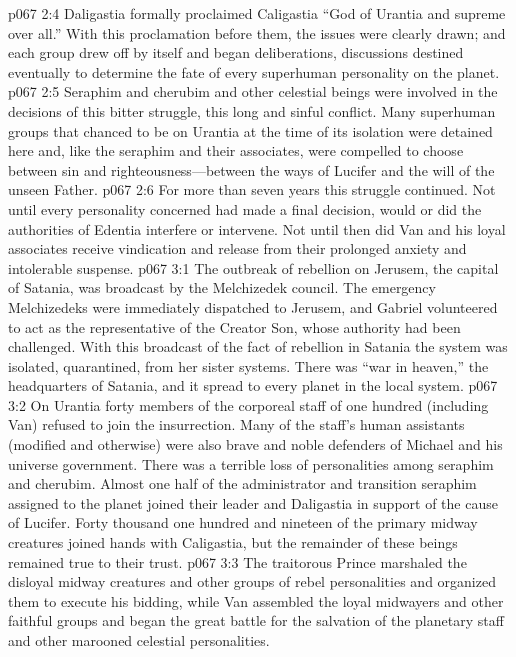 \pc \vs p067 2:4 Daligastia formally proclaimed Caligastia “God of Urantia and supreme over all.” With this proclamation before them, the issues were clearly drawn; and each group drew off by itself and began deliberations, discussions destined eventually to determine the fate of every superhuman personality on the planet.
\vs p067 2:5 Seraphim and cherubim and other celestial beings were involved in the decisions of this bitter struggle, this long and sinful conflict. Many superhuman groups that chanced to be on Urantia at the time of its isolation were detained here and, like the seraphim and their associates, were compelled to choose between sin and righteousness---between the ways of Lucifer and the will of the unseen Father.
\vs p067 2:6 For more than seven years this struggle continued. Not until every personality concerned had made a final decision, would or did the authorities of Edentia interfere or intervene. Not until then did Van and his loyal associates receive vindication and release from their prolonged anxiety and intolerable suspense.
\vs p067 3:1 The outbreak of rebellion on Jerusem, the capital of Satania, was broadcast by the Melchizedek council. The emergency Melchizedeks were immediately dispatched to Jerusem, and Gabriel volunteered to act as the representative of the Creator Son, whose authority had been challenged. With this broadcast of the fact of rebellion in Satania the system was isolated, quarantined, from her sister systems. There was “war in heaven,” the headquarters of Satania, and it spread to every planet in the local system.
\vs p067 3:2 On Urantia forty members of the corporeal staff of one hundred (including Van) refused to join the insurrection. Many of the staff’s human assistants (modified and otherwise) were also brave and noble defenders of Michael and his universe government. There was a terrible loss of personalities among seraphim and cherubim. Almost one half of the administrator and transition seraphim assigned to the planet joined their leader and Daligastia in support of the cause of Lucifer. Forty thousand one hundred and nineteen of the primary midway creatures joined hands with Caligastia, but the remainder of these beings remained true to their trust.
\vs p067 3:3 The traitorous Prince marshaled the disloyal midway creatures and other groups of rebel personalities and organized them to execute his bidding, while Van assembled the loyal midwayers and other faithful groups and began the great battle for the salvation of the planetary staff and other marooned celestial personalities.
